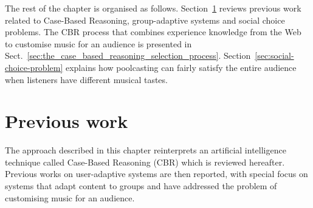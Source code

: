 
The rest of the chapter is organised as follows.
Section~\ref{sec:previous_works4} reviews previous work related to Case-Based Reasoning, group-adaptive systems and social choice problems.
%
The CBR process that combines experience knowledge from the Web to customise music for an audience is presented in Sect.~\ref{sec:the_case_based_reasoning_selection_process}.
%
Section~\ref{sec:social-choice-problem} explains how poolcasting can fairly satisfy the entire audience when listeners have different musical tastes.














\section{Previous work} %
\label{sec:previous_works4}

The approach described in this chapter reinterprets an artificial intelligence technique called Case-Based Reasoning (CBR) which is reviewed hereafter. Previous works on user-adaptive systems are then reported, with special focus on systems that adapt content to groups and have addressed the problem of customising music for an audience.

